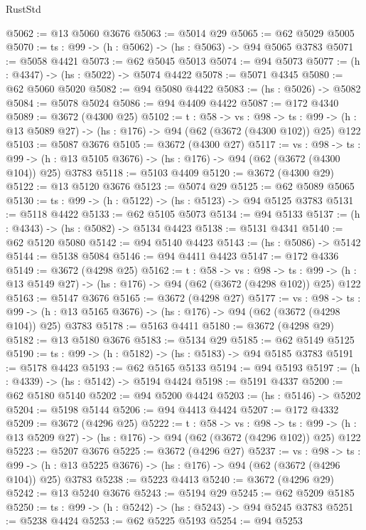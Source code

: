 \begin{lexlean}{RustStd}
\begin{coremodule}
@5062 := @13 @5060 @3676
@5063 := @5014 @29
@5065 := @62 @5029 @5005
@5070 := {ts : @99} -> (h : @5062) -> (hs : @5063) -> @94 @5065 @3783
@5071 := @5058 @4421
@5073 := @62 @5045 @5013
@5074 := @94 @5073
@5077 := (h : @4347) -> (hs : @5022) -> @5074 @4422
@5078 := @5071 @4345
@5080 := @62 @5060 @5020
@5082 := @94 @5080 @4422
@5083 := (hs : @5026) -> @5082
@5084 := @5078 @5024
@5086 := @94 @4409 @4422
@5087 := @172 @4340
@5089 := @3672 (@4300 @25)
@5102 := {t : @58} ->
  {vs : @98} ->
  {ts : @99} -> (h : @13 @5089 @27) -> (hs : @176) -> @94 (@62 (@3672 (@4300 @102)) @25) @122
@5103 := @5087 @3676
@5105 := @3672 (@4300 @27)
@5117 := {vs : @98} ->
  {ts : @99} -> (h : @13 @5105 @3676) -> (hs : @176) -> @94 (@62 (@3672 (@4300 @104)) @25) @3783
@5118 := @5103 @4409
@5120 := @3672 (@4300 @29)
@5122 := @13 @5120 @3676
@5123 := @5074 @29
@5125 := @62 @5089 @5065
@5130 := {ts : @99} -> (h : @5122) -> (hs : @5123) -> @94 @5125 @3783
@5131 := @5118 @4422
@5133 := @62 @5105 @5073
@5134 := @94 @5133
@5137 := (h : @4343) -> (hs : @5082) -> @5134 @4423
@5138 := @5131 @4341
@5140 := @62 @5120 @5080
@5142 := @94 @5140 @4423
@5143 := (hs : @5086) -> @5142
@5144 := @5138 @5084
@5146 := @94 @4411 @4423
@5147 := @172 @4336
@5149 := @3672 (@4298 @25)
@5162 := {t : @58} ->
  {vs : @98} ->
  {ts : @99} -> (h : @13 @5149 @27) -> (hs : @176) -> @94 (@62 (@3672 (@4298 @102)) @25) @122
@5163 := @5147 @3676
@5165 := @3672 (@4298 @27)
@5177 := {vs : @98} ->
  {ts : @99} -> (h : @13 @5165 @3676) -> (hs : @176) -> @94 (@62 (@3672 (@4298 @104)) @25) @3783
@5178 := @5163 @4411
@5180 := @3672 (@4298 @29)
@5182 := @13 @5180 @3676
@5183 := @5134 @29
@5185 := @62 @5149 @5125
@5190 := {ts : @99} -> (h : @5182) -> (hs : @5183) -> @94 @5185 @3783
@5191 := @5178 @4423
@5193 := @62 @5165 @5133
@5194 := @94 @5193
@5197 := (h : @4339) -> (hs : @5142) -> @5194 @4424
@5198 := @5191 @4337
@5200 := @62 @5180 @5140
@5202 := @94 @5200 @4424
@5203 := (hs : @5146) -> @5202
@5204 := @5198 @5144
@5206 := @94 @4413 @4424
@5207 := @172 @4332
@5209 := @3672 (@4296 @25)
@5222 := {t : @58} ->
  {vs : @98} ->
  {ts : @99} -> (h : @13 @5209 @27) -> (hs : @176) -> @94 (@62 (@3672 (@4296 @102)) @25) @122
@5223 := @5207 @3676
@5225 := @3672 (@4296 @27)
@5237 := {vs : @98} ->
  {ts : @99} -> (h : @13 @5225 @3676) -> (hs : @176) -> @94 (@62 (@3672 (@4296 @104)) @25) @3783
@5238 := @5223 @4413
@5240 := @3672 (@4296 @29)
@5242 := @13 @5240 @3676
@5243 := @5194 @29
@5245 := @62 @5209 @5185
@5250 := {ts : @99} -> (h : @5242) -> (hs : @5243) -> @94 @5245 @3783
@5251 := @5238 @4424
@5253 := @62 @5225 @5193
@5254 := @94 @5253

\end{coremodule}
\end{lexlean}
